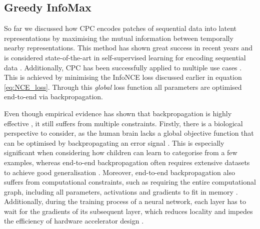 \subsection{Greedy InfoMax}
	So far we discussed how CPC encodes patches of sequential data into latent representations by maximising the mutual information between temporally nearby representations. This method has shown great success in recent years and is considered state-of-the-art in self-supervised learning for encoding sequential data \citep{stackeEvaluationContrastivePredictive2020}. Additionally, CPC has been successfully applied to multiple use cases \citep{stackeEvaluationContrastivePredictive2020, dehaanContrastivePredictiveCoding2021, luSemiSupervisedHistologyClassification2019, bhatiSegmentalContrastivePredictive2021b, deldariTimeSeriesChange2021, henaffDataEfficientImageRecognition2020}. This is achieved by minimising the InfoNCE loss discussed earlier in equation \ref{eq:NCE_loss}. Through this \textit{global} loss function all parameters are optimised end-to-end via backpropagation. 
	
	Even though empirical evidence has shown that backpropagation is highly effective \citep{NIPS2012_c399862d, ioffeBatchNormalizationAccelerating2015}, it still suffers from multiple constraints. Firstly, there is a biological perspective to consider, as the human brain lacks a global objective function that can be optimised by backpropagating an error signal \citep{marblestoneIntegrationDeepLearning2016}. This is especially significant when considering how children can learn to categorise from a few examples, whereas end-to-end backpropagation often requires extensive datasets to achieve good generalisation \citep{lowePuttingEndEndtoEnd2020a}. Moreover, end-to-end backpropagation also suffers from computational constraints, such as requiring the entire computational graph, including all parameters, activations and gradients to fit in memory \citep{lowePuttingEndEndtoEnd2020a}. Additionally, during the training process of a neural network, each layer has to wait for the gradients of its subsequent layer, which reduces locality and impedes the efficiency of hardware accelerator design \citep{lowePuttingEndEndtoEnd2020a}.
		
		
	
